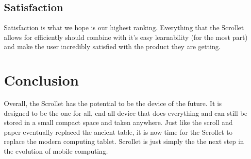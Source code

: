 \documentclass[a4paper]{article}
\begin{document}
\subsection{Satisfaction}
Satisfaction is what we hope is our highest ranking. Everything that the Scrollet allows for efficiently should combine with it's easy learnability (for the most part) and make the user incredibly satisfied with the product they are getting. 

\section{Conclusion}
Overall, the Scrollet has the potential to be the device of the future. It is designed to be the one-for-all, end-all device that does everything and can still be stored in a small compact space and taken anywhere. Just like the scroll and paper eventually replaced the ancient table, it is now time for the Scrollet to replace the modern computing tablet. Scrollet is just simply the the next step in the evolution of mobile computing.



\end{document}
